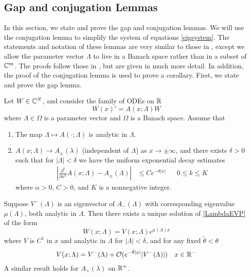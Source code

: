 \documentclass[thesis.tex]{subfiles}
\begin{document}
\subsection{Gap and conjugation Lemmas}

In this section, we state and prove the gap and conjugation lemmas. We will use the conjugation lemma to simplify the system of equations \cref{eigsystem}. The statements and notation of these lemmas are very similar to those in \cite{Zumbrun2009}, except we allow the parameter vector $\Lambda$ to live in a Banach space rather than in a subset of $\mathbb{C}^m$. The proofs follow those in \cite{Zumbrun2009}, but are given in much more detail. In addition, the proof of the conjugation lemma is used to prove a corollary. First, we state and prove the gap lemma.

\begin{lemma}\label{gaplemma}
Let $W \in \mathbb{C}^N$, and consider the family of ODEs on $\mathbb{R}$
\begin{equation}\label{LambdaEVP}
W(x)' = A(x; \Lambda) W
\end{equation}
where $\Lambda \in \Omega$ is a parameter vector and $\Omega$ is a Banach space. Assume that
\begin{enumerate}
	\item The map $\Lambda \mapsto A(\cdot; \Lambda)$ is analytic in $\Lambda$.
	\item $A(x; \Lambda) \rightarrow A_\pm(\lambda)$ (independent of $\Lambda$) as $x \rightarrow \pm \infty$, and there exists $\delta > 0$ such that for $|\Lambda| < \delta$ we have the uniform exponential decay estimates 
	\begin{align}\label{ALambdadecay}
	\left| \frac{\partial^k}{\partial x^k} A(x; \Lambda) - A_\pm(\Lambda) \right| 
	&\leq C e^{-\theta |x|} && 0 \leq k \leq K
	\end{align}
	where $\alpha > 0$, $C > 0$, and $K$ is a nonnegative integer.
\end{enumerate}
Suppose $V^-(\Lambda)$ is an eigenvector of $A_-(\Lambda)$ with corresponding eigenvalue $\mu(\Lambda)$, both analytic in $\Lambda$. Then there exists a unique solution of \ref{LambdaEVP} of the form 
\begin{equation}
W(x; \Lambda) = V(x; \Lambda) e^{\mu(\Lambda)x}
\end{equation}
where $V$ is $C^1$ in $x$ and analytic in $\Lambda$ for $|\Lambda| < \delta$, and for any fixed $\tilde{\theta} < \theta$
\begin{align}
V(x; \Lambda) = V^-(\Lambda) + \mathcal{O}(e^{-\tilde{\theta}|x|}|V^-(\Lambda)|) && x \in \mathbb{R}^-
\end{align}
A similar result holds for $A_+(\lambda)$ on $\mathbb{R}^+$.


\end{lemma}
\end{document}

